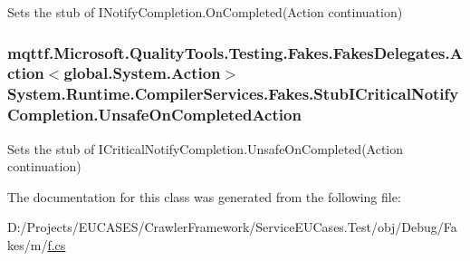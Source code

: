 Sets the stub of I\-Notify\-Completion.\-On\-Completed(\-Action continuation)

\hypertarget{class_system_1_1_runtime_1_1_compiler_services_1_1_fakes_1_1_stub_i_critical_notify_completion_a782dabaf5d9d6ba625e63f4184f95325}{
\subsubsection[{Unsafe\-On\-Completed\-Action}]{\setlength{\rightskip}{0pt plus 5cm}mqttf.\-Microsoft.\-Quality\-Tools.\-Testing.\-Fakes.\-Fakes\-Delegates.\-Action$<$global.\-System.\-Action$>$ System.\-Runtime.\-Compiler\-Services.\-Fakes.\-Stub\-I\-Critical\-Notify\-Completion.\-Unsafe\-On\-Completed\-Action}}\label{class_system_1_1_runtime_1_1_compiler_services_1_1_fakes_1_1_stub_i_critical_notify_completion_a782dabaf5d9d6ba625e63f4184f95325}


Sets the stub of I\-Critical\-Notify\-Completion.\-Unsafe\-On\-Completed(\-Action continuation)



The documentation for this class was generated from the following file\-:\begin{DoxyCompactItemize}
\item 
D\-:/\-Projects/\-E\-U\-C\-A\-S\-E\-S/\-Crawler\-Framework/\-Service\-E\-U\-Cases.\-Test/obj/\-Debug/\-Fakes/m/\hyperlink{m_2f_8cs}{f.\-cs}\end{DoxyCompactItemize}
